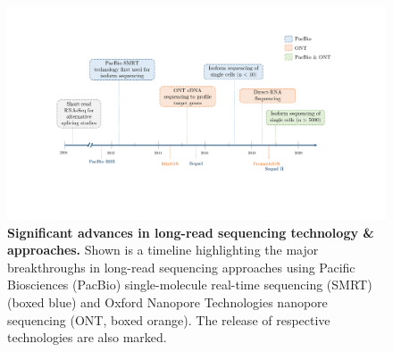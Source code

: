 \begin{landscape}
	\begin{figure}[]
		\centering
		\includegraphics[page=1,trim={0 4cm 1.8cm 2cm},clip, scale = 0.8]{Figures/Introduction_Figures_Landscape.pdf}
		\caption[Timeline of long-read sequencing technologies \& approaches]%
		{\textbf{Significant advances in long-read sequencing technology \& approaches.} Shown is a timeline highlighting the major breakthroughs in long-read sequencing approaches using Pacific Biosciences (PacBio) single-molecule real-time sequencing (SMRT) (boxed blue) and Oxford Nanopore Technologies nanopore sequencing (ONT, boxed orange). The release of respective technologies are also marked.}
		\label{fig:longread_timeline}
	\end{figure}
\end{landscape}


